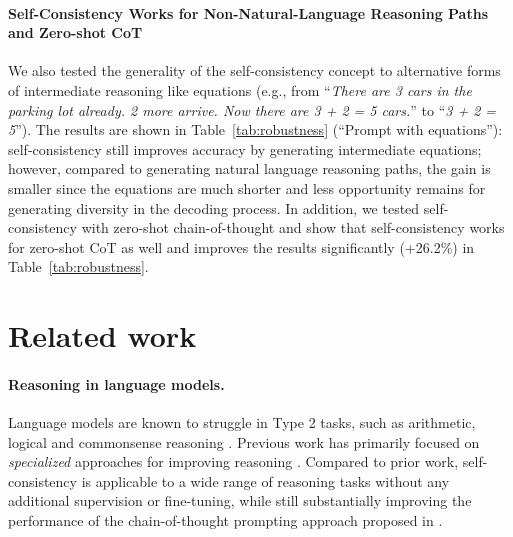 \documentclass{article} %
\begin{document}
\vspace{-0.05in}
\paragraph{Self-Consistency Works for Non-Natural-Language Reasoning Paths and Zero-shot CoT}
We also tested the generality of the self-consistency concept to alternative forms of intermediate reasoning like equations (e.g., from ``\textit{There are 3 cars in the parking lot already. 2 more arrive. Now there are 3 + 2 = 5 cars.}'' to ``\textit{3 + 2 = 5}''). The results are shown in Table~\ref{tab:robustness} (``Prompt with equations''): self-consistency still improves accuracy by generating intermediate equations; however, compared to generating natural language reasoning paths, the gain is smaller since the equations are much shorter and less opportunity remains for generating diversity in the decoding process.
In addition, we tested self-consistency with zero-shot chain-of-thought \citep{zero_shot_cot} and show that self-consistency works for zero-shot CoT as well and improves the results  significantly (+26.2\%) in Table~\ref{tab:robustness}.


\section{Related work}
\paragraph{Reasoning in language models.}
Language models are known to struggle in Type 2 tasks, such as arithmetic, logical and commonsense reasoning \citep{evans2010intuition}.
Previous work has primarily focused on \textit{specialized} approaches for improving reasoning \citep{andor-etal-2019-giving,ran-etal-2019-numnet,geva-etal-2020-injecting,piekos-etal-2021-measuring}.
Compared to prior work, self-consistency is applicable to a wide range of reasoning tasks without any additional supervision or fine-tuning,  while still substantially improving the performance of the chain-of-thought prompting approach proposed in \citet{wei2022chain}.
\end{document}
